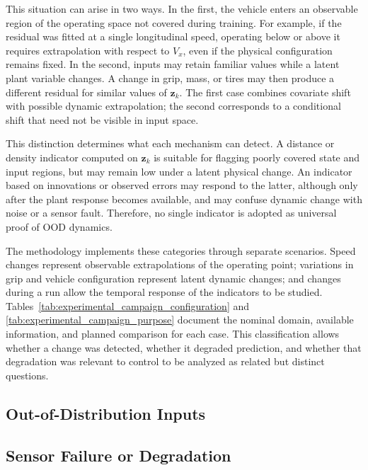 \documentclass[12pt,a4paper]{report}
\begin{document}
This situation can arise in two ways. In the first, the vehicle enters an observable region of the operating space not covered during training. For example, if the residual was fitted at a single longitudinal speed, operating below or above it requires extrapolation with respect to $V_x$, even if the physical configuration remains fixed. In the second, inputs may retain familiar values while a latent plant variable changes. A change in grip, mass, or tires may then produce a different residual for similar values of $\mathbf{z}_k$. The first case combines covariate shift with possible dynamic extrapolation; the second corresponds to a conditional shift that need not be visible in input space.

This distinction determines what each mechanism can detect. A distance or density indicator computed on $\mathbf{z}_k$ is suitable for flagging poorly covered state and input regions, but may remain low under a latent physical change. An indicator based on innovations or observed errors may respond to the latter, although only after the plant response becomes available, and may confuse dynamic change with noise or a sensor fault. Therefore, no single indicator is adopted as universal proof of OOD dynamics.

The methodology implements these categories through separate scenarios. Speed changes represent observable extrapolations of the operating point; variations in grip and vehicle configuration represent latent dynamic changes; and changes during a run allow the temporal response of the indicators to be studied. Tables~\ref{tab:experimental_campaign_configuration} and \ref{tab:experimental_campaign_purpose} document the nominal domain, available information, and planned comparison for each case. This classification allows whether a change was detected, whether it degraded prediction, and whether that degradation was relevant to control to be analyzed as related but distinct questions.

\subsection{Out-of-Distribution Inputs}


\subsection{Sensor Failure or Degradation}
\end{document}
